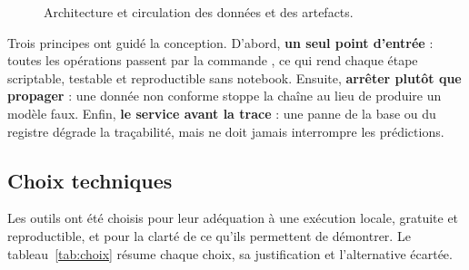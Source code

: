 \documentclass[11pt,a4paper]{article}
\newcommand{\code}[1]{\texttt{\detokenize{#1}}}
\begin{document}
\begin{figure}[htbp]
\caption{Architecture et circulation des données et des artefacts.}\label{fig:archi}
\end{figure}

Trois principes ont guidé la conception. D'abord, \textbf{un seul point d'entrée} : toutes
les opérations passent par la commande \code{retail}, ce qui rend chaque étape scriptable,
testable et reproductible sans notebook. Ensuite, \textbf{arrêter plutôt que propager} :
une donnée non conforme stoppe la chaîne au lieu de produire un modèle faux. Enfin,
\textbf{le service avant la trace} : une panne de la base ou du registre dégrade la
traçabilité, mais ne doit jamais interrompre les prédictions.

\subsection{Choix techniques}

Les outils ont été choisis pour leur adéquation à une exécution locale, gratuite et
reproductible, et pour la clarté de ce qu'ils permettent de démontrer. Le
tableau~\ref{tab:choix} résume chaque choix, sa justification et l'alternative écartée.
\end{document}
